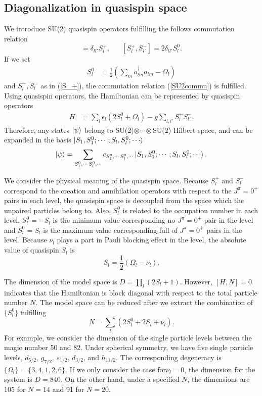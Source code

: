 \documentclass[11pt]{book} %
\begin{document}
\subsection{Diagonalization in quasispin space}
We introduce SU(2) quasispin operators fulfilling the follows commutation relation
\begin{equation}
  [S_l^0,S_{l'}^{+}] = \delta_{ll'}S_{l}^{+},\hspace{20pt}[S_{l}^{+},S_{l'}^{-}] = 2\delta_{ll'}S_{l}^{0}. 
  \label{SU2commu}
\end{equation}
If we set 
\begin{align}
  S_l^0 &= \frac{1}{2}(\sum_ma_{lm}^{\dag}a_{lm}-\Omega_l)
  \label{S_0}
\end{align}
and $S_l^+, S_l^-$ as in (\ref{S_+}), the commutation relation (\ref{SU2commu}) is fulfilled. Using quasispin operators, the Hamiltonian can be represented by quasispin operators
\begin{align}
	H &= \sum_l \epsilon_l (2S_l^0+\Omega_l) - g \sum_{l,l'} S_l^+ S_{l'}^- .
\end{align}
Therefore, any states $\ket{\psi}$ belong to SU(2)$\otimes\cdots\otimes$SU(2) Hilbert space, and can be expanded in the basis $\ket{S_1,S_1^0;\cdots;S_l,S_l^0;\cdots}$
\begin{equation}
  \ket{\psi} = \sum_{S_1^0,\cdots\,S_l^0,\cdots}c_{S_1^0,\cdots\,S_l^0,\cdots}\ket{S_1,S_1^0;\cdots;S_l,S_l^0;\cdots} .
\end{equation}

We consider the physical meaning of the quasispin space. Because $S_l^+$ and $S_l^-$ correspond to the creation and annihilation operators with respect to the $J^{\pi}=0^+$ pairs in each level, the quasispin space is decoupled from the space which the unpaired particles belong to. 
Also, $S_l^0$ is related to the occupation number in each level. $S_l^0=-S_l$ is the minimum value corresponding no $J^{\pi}=0^+$ pair in the level and $S_l^0=S_l$ is the maximum value corresponding full of $J^{\pi}=0^+$ pairs in the level. Because $\nu_l$ plays a part in Pauli blocking effect in the level, the absolute value of quasispin $S_l$ is
\begin{equation}
  S_l = \frac{1}{2}(\Omega_l-\nu_l).
\end{equation}

The dimension of the model space is $D=\prod_l(2S_l+1)$. However, $[H,N]=0$ indicates that the Hamiltonian is block diagonal with respect to the total particle number $N$. The model space can be reduced after we extract the combination of $\{S_l^0\}$ fulfilling
\begin{equation}
  N = \sum_l (2S_l^0+2S_l+\nu_l) .
\end{equation} 
For example, we consider the dimension of the single particle levels between the magic number 50 and 82. Under spherical symmetry, we have five single particle levels, $d_{5/2}$, $g_{7/2}$, $s_{1/2}$, $d_{3/2}$, and $h_{11/2}$. The corresponding degeneracy is $\{\Omega_l\}=\{3,4,1,2,6\}$. If we only consider the case for$\nu_l=0$, the dimension for the system is $D=840$. On the other hand, under a specified $N$, the dimensions are 105 for $N=14$ and 91 for $N=20$.
\end{document}
